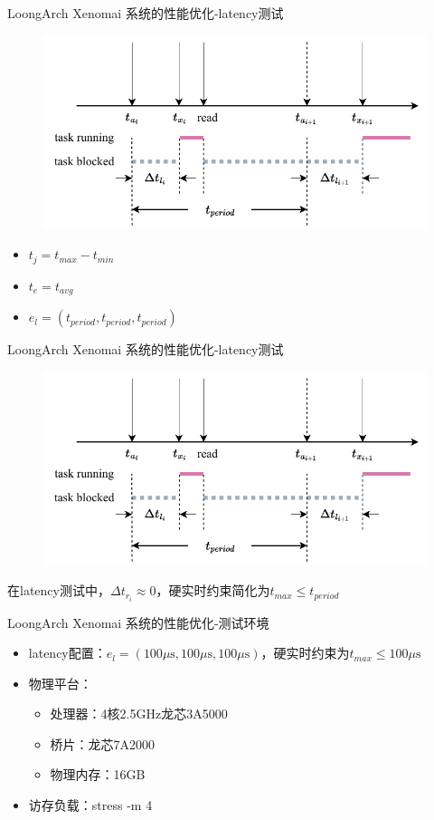 \documentclass{beamer}
\begin{document}
\begin{frame}{LoongArch Xenomai 系统的性能优化-latency测试}
    \begin{figure}[!htbp]
        \includegraphics[width=.8\textwidth]{img/Img/latency-time-line.pdf}
    \end{figure}
    \begin{itemize}
        \item $t_j=t_{max}-t_{min}$
        \item $t_e=t_{avg}$
        \item $e_l=(t_{period}, t_{period}, t_{period})$
    \end{itemize}
\end{frame}

\begin{frame}{LoongArch Xenomai 系统的性能优化-latency测试}
    \begin{figure}[!htbp]
        \includegraphics[width=.8\textwidth]{img/Img/latency-time-line.pdf}
    \end{figure}
    在latency测试中，$\Delta t_{r_i}\approx 0$，硬实时约束简化为$t_{max}\le t_{period}$
\end{frame}

\begin{frame}{LoongArch Xenomai 系统的性能优化-测试环境}
    \begin{itemize}
        \item latency配置：$e_l=(100\mu \text{s}, 100\mu \text{s}, 100\mu \text{s})$，硬实时约束为$t_{max}\le 100\mu \text{s}$
        \item 物理平台：
            \begin{itemize}
                \item 处理器：4核2.5GHz龙芯3A5000
                \item 桥片：龙芯7A2000
                \item 物理内存：16GB
            \end{itemize}
        \item 访存负载：{\ttfamily stress -m 4}
    \end{itemize}
\end{frame}
\end{document}
